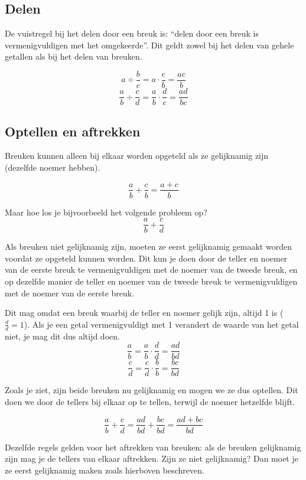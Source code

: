 \documentclass[
  a4paper,
]{scrbook}
\theoremstyle{definition}
\theoremstyle{remark}
\begin{document}
\hypertarget{delen}{%
\subsection*{Delen}\label{delen}}

De vuistregel bij het delen door een breuk is: ``delen door een breuk is
vermenigvuldigen met het omgekeerde''. Dit geldt zowel bij het delen van
gehele getallen als bij het delen van breuken.

\[
a\div \frac{b}{c} = a\cdot\frac{c}{b} = \frac{ac}{b}
\] \[
\frac{a}{b}\div\frac{c}{d} = \frac{a}{b}\cdot\frac{d}{c} = \frac{ad}{bc}
\]

\hypertarget{optellen-en-aftrekken}{%
\subsection*{Optellen en aftrekken}\label{optellen-en-aftrekken}}

Breuken kunnen alleen bij elkaar worden opgeteld als ze gelijknamig zijn
(dezelfde noemer hebben).

\[
\frac{a}{b}+\frac{c}{b} = \frac{a+c}{b}
\]

Maar hoe los je bijvoorbeeld het volgende probleem op? \[
\frac{a}{b}+\frac{c}{d} 
\]

Als breuken niet gelijknamig zijn, moeten ze eerst gelijknamig gemaakt
worden voordat ze opgeteld kunnen worden. Dit kun je doen door de teller
en noemer van de eerste breuk te vermenigvuldigen met de noemer van de
tweede breuk, en op dezelfde manier de teller en noemer van de tweede
breuk te vermenigvuldigen met de noemer van de eerste breuk.

Dit mag omdat een breuk waarbij de teller en noemer gelijk zijn, altijd
1 is (\(\frac{d}{d}=1\)). Als je een getal vermenigvuldigt met 1
verandert de waarde van het getal niet, je mag dit dus altijd doen. \[
\frac{a}{b} = \frac{a}{b}\cdot\frac{d}{d} = \frac{ad}{bd}
\] \[
\frac{c}{d} = \frac{c}{d}\cdot\frac{b}{b} = \frac{bc}{bd}
\]

Zoals je ziet, zijn beide breuken nu gelijknamig en mogen we ze dus
optellen. Dit doen we door de tellers bij elkaar op te tellen, terwijl
de noemer hetzelfde blijft.

\[
\frac{a}{b}+\frac{c}{d} = \frac{ad}{bd}+\frac{bc}{bd} = \frac{ad + bc}{bd}
\]

Dezelfde regels gelden voor het aftrekken van breuken: als de breuken
gelijknamig zijn mag je de tellers van elkaar aftrekken. Zijn ze niet
gelijknamig? Dan moet je ze eerst gelijknamig maken zoals hierboven
beschreven.
\end{document}
